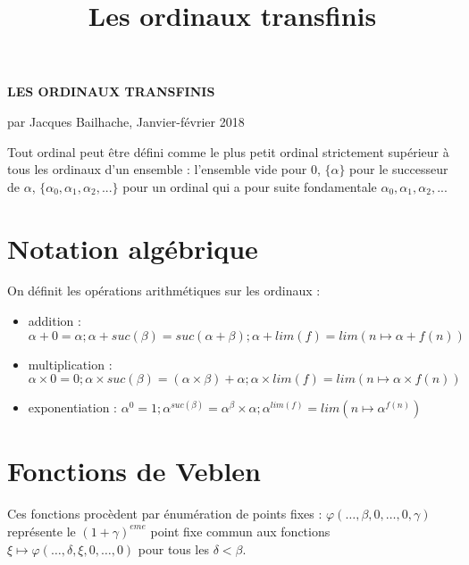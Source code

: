 \documentclass[8pt]{article}
\title{Les ordinaux transfinis}
\begin{document}
\setlength{\parindent}{0pt}

\vspace{-0.4cm}

\begin{center}
\textbf{LES ORDINAUX TRANSFINIS}

par Jacques Bailhache, Janvier-février 2018
\end{center}

\vspace{-0.2cm}

Tout ordinal peut être défini comme le plus petit ordinal strictement supérieur à tous les ordinaux d'un ensemble : l'ensemble vide pour 0, \(\lbrace \alpha \rbrace\) pour le successeur de \(\alpha\), \(\lbrace \alpha_0,\alpha_1,\alpha_2,...\rbrace\) pour un ordinal qui a pour suite fondamentale \(\alpha_0, \alpha_1, \alpha_2, ...\)

\vspace{-0.7cm}

\section{Notation algébrique}
\vspace{-0.4cm}
On définit les opérations arithmétiques sur les ordinaux :
\vspace{-0.4cm}
\smallskip
\begin{itemize}
     \setlength{\itemsep}{1pt}
     \setlength{\parskip}{0pt}
     \setlength{\parsep}{0pt}
\item addition : \( \alpha+0=\alpha ; \alpha+suc(\beta)=suc(\alpha+\beta); \alpha+lim(f)=lim(n \mapsto \alpha+f(n)) \)
\vspace{-0.1cm}
\item multiplication : \( \alpha \times 0 = 0 ; \alpha \times suc(\beta) = (\alpha \times \beta) + \alpha ; \alpha \times lim(f) = lim (n \mapsto \alpha \times f(n)) \)
\vspace{-0.1cm}
\item exponentiation : \( \alpha^0 = 1 ; \alpha^{suc(\beta)} = \alpha^\beta \times \alpha ; \alpha^{lim(f)} = lim (n \mapsto \alpha^{f(n)}) \)
\end{itemize}
\vspace{-0.8cm}

\section{Fonctions de Veblen}
\vspace{-0.4cm}
Ces fonctions procèdent par énumération de points fixes : \(\varphi(\ldots,\beta,0,\ldots,0,\gamma) \) représente le \((1+\gamma)^{eme}\) point fixe commun aux fonctions \( \xi \mapsto \varphi(\ldots,\delta,\xi,0,\ldots,0)\) pour tous les \(\delta < \beta\).
\vspace{-0.6cm}
\end{document}

